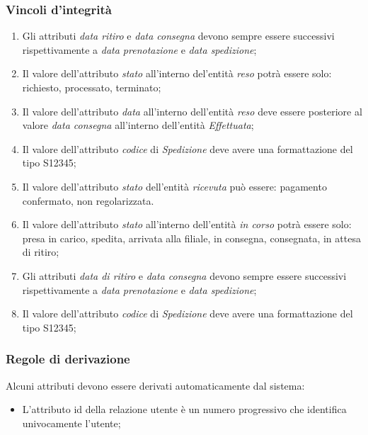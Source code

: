 \subsubsection*{Vincoli d'integrità}
\begin{enumerate}
  \item Gli attributi \textit{data ritiro} e \textit{data consegna} devono sempre essere successivi rispettivamente a \textit{data prenotazione} e \textit{data spedizione};
	\item Il valore dell'attributo \textit{stato} all'interno del'entità \textit{reso} potrà essere solo: richiesto, processato, terminato;
	\item Il valore dell'attributo \textit{data} all'interno dell'entità \textit{reso} deve essere posteriore al valore \textit{data consegna} all'interno dell'entità \textit{Effettuata};
	\item Il valore dell'attributo \textit{codice} di \textit{Spedizione} deve avere una formattazione del tipo S12345;
	\item Il valore dell'attributo \textit{stato} dell'entità \textit{ricevuta} può essere: pagamento confermato, non regolarizzata. 
	\item Il valore dell'attributo \textit{stato} all'interno dell'entità \textit{in corso} potrà essere solo: presa in carico, spedita, arrivata alla filiale, in consegna, consegnata, in attesa di ritiro;
	\item Gli attributi \textit{data di ritiro} e \textit{data consegna} devono sempre essere successivi rispettivamente a \textit{data prenotazione} e \textit{data spedizione};
	\item Il valore dell'attributo \textit{codice} di \textit{Spedizione} deve avere una formattazione del tipo S12345;
	
\end{enumerate}

\subsubsection*{Regole di derivazione}
Alcuni attributi devono essere derivati automaticamente dal sistema:
\begin{itemize}
  \item L'attributo id della relazione utente è un numero progressivo che identifica univocamente l'utente;
  
\end{itemize}
